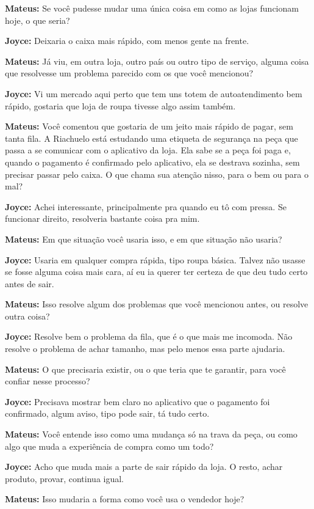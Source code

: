 \textbf{Mateus:} Se você pudesse mudar uma única coisa em como as lojas funcionam hoje, o que seria?

\textbf{Joyce:} Deixaria o caixa mais rápido, com menos gente na frente.

\textbf{Mateus:} Já viu, em outra loja, outro país ou outro tipo de serviço, alguma coisa que resolvesse um problema parecido com os que você mencionou?

\textbf{Joyce:} Vi um mercado aqui perto que tem uns totem de autoatendimento bem rápido, gostaria que loja de roupa tivesse algo assim também.

\textbf{Mateus:} Você comentou que gostaria de um jeito mais rápido de pagar, sem tanta fila. A Riachuelo está estudando uma etiqueta de segurança na peça que passa a se comunicar com o aplicativo da loja. Ela sabe se a peça foi paga e, quando o pagamento é confirmado pelo aplicativo, ela se destrava sozinha, sem precisar passar pelo caixa. O que chama sua atenção nisso, para o bem ou para o mal?

\textbf{Joyce:} Achei interessante, principalmente pra quando eu tô com pressa. Se funcionar direito, resolveria bastante coisa pra mim.

\textbf{Mateus:} Em que situação você usaria isso, e em que situação não usaria?

\textbf{Joyce:} Usaria em qualquer compra rápida, tipo roupa básica. Talvez não usasse se fosse alguma coisa mais cara, aí eu ia querer ter certeza de que deu tudo certo antes de sair.

\textbf{Mateus:} Isso resolve algum dos problemas que você mencionou antes, ou resolve outra coisa?

\textbf{Joyce:} Resolve bem o problema da fila, que é o que mais me incomoda. Não resolve o problema de achar tamanho, mas pelo menos essa parte ajudaria.

\textbf{Mateus:} O que precisaria existir, ou o que teria que te garantir, para você confiar nesse processo?

\textbf{Joyce:} Precisava mostrar bem claro no aplicativo que o pagamento foi confirmado, algum aviso, tipo pode sair, tá tudo certo.

\textbf{Mateus:} Você entende isso como uma mudança só na trava da peça, ou como algo que muda a experiência de compra como um todo?

\textbf{Joyce:} Acho que muda mais a parte de sair rápido da loja. O resto, achar produto, provar, continua igual.

\textbf{Mateus:} Isso mudaria a forma como você usa o vendedor hoje?

